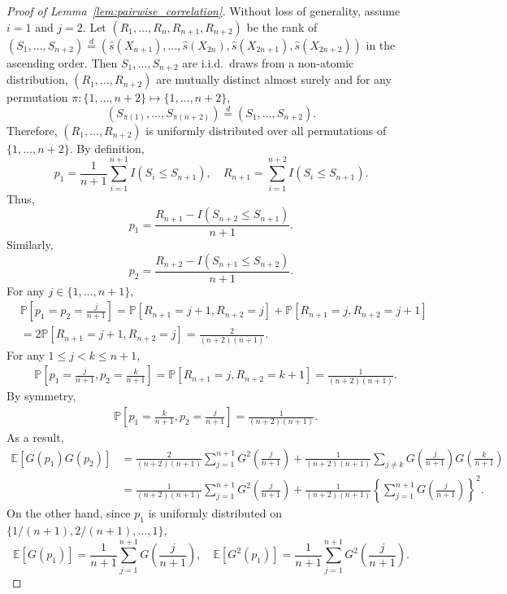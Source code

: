 \documentclass[11pt]{article}
\def\E{\mathbb{E}}
\renewcommand{\P}{\mathbb{P}}
\begin{document}
\begin{proof}[Proof of Lemma~\ref{lem:pairwise_correlation}]
Without loss of generality, assume $i = 1$ and $j = 2$. Let $(R_1, \ldots, R_n, R_{n+1}, R_{n+2})$ be the rank of $(S_{1}, \ldots, S_{n+2})\stackrel{d}{=}(\hat{s}(X_{n+1}), \ldots, \hat{s}(X_{2n}), \hat{s}(X_{2n+1}), \hat{s}(X_{2n+2}))$ in the ascending order. Then $S_1, \ldots, S_{n+2}$ are i.i.d.~draws from a non-atomic distribution, $(R_1, \ldots, R_{n+2})$ are mutually distinct almost surely and for any permutation $\pi: \{1, \ldots, n+2\}\mapsto \{1, \ldots, n+2\}$, 
\[(S_{\pi(1)}, \ldots, S_{\pi(n+2)})\stackrel{d}{=}(S_1, \ldots, S_{n+2}).\]
Therefore, $(R_1, \ldots, R_{n+2})$ is uniformly distributed over all permutations of $\{1, \ldots, n + 2\}$.
By definition, 
\[p_1 = \frac{1}{n+1}\sum_{i=1}^{n+1}I(S_i \le S_{n+1}), \quad R_{n+1} = \sum_{i=1}^{n+2}I(S_i \le S_{n+1}).\]
Thus, 
\[p_1 = \frac{R_{n+1} - I(S_{n+2}\le S_{n+1})}{n+1}.\]
Similarly,
\[p_2 = \frac{R_{n+2} - I(S_{n+1}\le S_{n+2})}{n+1}.\]
For any $j\in \{1, \ldots, n+1\}$, 
\begin{align*}
&\P\left[p_1 = p_2 = \frac{j}{n+1}\right] = \P\left[ R_{n+1} = j+1, R_{n+2} = j\right]+ \P\left[ R_{n+1} = j, R_{n+2} = j+1\right]  \\
& = 2\P\left[ R_{n+1} = j+1, R_{n+2} = j \right] = \frac{2}{(n+2)(n+1)}.
\end{align*}
For any $1 \le j < k\le n+1$, 
\begin{align*}
&\P\left[ p_1 = \frac{j}{n+1}, p_2 = \frac{k}{n+1}\right] = \P\left[ R_{n+1} = j, R_{n+2} = k + 1 \right] = \frac{1}{(n+2)(n+1)}.
\end{align*}
By symmetry,
\begin{align*}
&\P\left[ p_1 = \frac{k}{n+1}, p_2 = \frac{j}{n+1} \right] = \frac{1}{(n+2)(n+1)}.
\end{align*}
As a result,
\begin{align*}
\E[G(p_1)G(p_2)] &= \frac{2}{(n+2)(n+1)}\sum_{j=1}^{n+1}G^2\left(\frac{j}{n+1}\right) + \frac{1}{(n+2)(n+1)}\sum_{j\not=k}G\left(\frac{j}{n+1}\right)G\left(\frac{k}{n+1}\right)\\
& = \frac{1}{(n+2)(n+1)}\sum_{j=1}^{n+1}G^2\left(\frac{j}{n+1}\right) + \frac{1}{(n+2)(n+1)}\left\{\sum_{j=1}^{n+1}G\left(\frac{j}{n+1}\right)\right\}^2.
\end{align*}
On the other hand, since $p_1$ is uniformly distributed on $\{1 / (n+1), 2 / (n + 1), \ldots, 1\}$, 
\[\E[G(p_1)] = \frac{1}{n+1}\sum_{j=1}^{n+1}G\left(\frac{j}{n+1}\right), \quad \E[G^2(p_1)] = \frac{1}{n+1}\sum_{j=1}^{n+1}G^2\left(\frac{j}{n+1}\right).\]

\end{proof}
\end{document}
